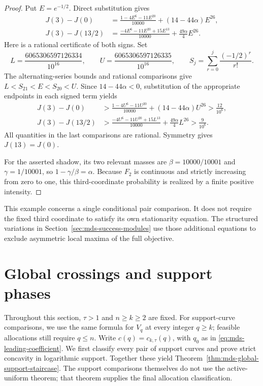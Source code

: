 \documentclass[11pt]{article}
\theoremstyle{definition}
\theoremstyle{remark}
\newcommand{\1}{\mathbf 1}
\begin{document}
\begin{proof}
Put \(E=e^{-1/2}\).  Direct substitution gives
\begin{align*}
  J(3)-J(0)
  &=\frac{1-4E^6-11E^{20}}{10000}
    +(14-44\alpha)E^{26},\\
  J(3)-J(13/2)
  &=\frac{-4E^6-11E^{20}+15E^{13}}{10000}
    +\frac{49\alpha}{4}E^{26}.
\end{align*}
Here is a rational certificate of both signs.  Set
\[
  L=\frac{6065306597126334}{10^{16}},\qquad
  U=\frac{6065306597126335}{10^{16}},\qquad
  S_j=\sum_{r=0}^j\frac{(-1/2)^r}{r!}.
\]
The alternating-series bounds and rational comparisons give
\(L<S_{21}<E<S_{20}<U\).  Since \(14-44\alpha<0\), substitution
of the appropriate endpoints in each signed term yields
\begin{align*}
  J(3)-J(0)
  &>\frac{1-4U^6-11U^{20}}{10000}
      +(14-44\alpha)U^{26}
    >\frac{12}{10^6},\\
  J(3)-J(13/2)
  &>\frac{-4U^6-11U^{20}+15L^{13}}{10000}
      +\frac{49\alpha}{4}L^{26}
    >\frac9{10^6}.
\end{align*}
All quantities in the last comparisons are rational.  Symmetry gives
\(J(13)=J(0)\).

For the asserted shadow, its two relevant masses are
\(\beta=10000/10001\) and \(\gamma=1/10001\), so
\(1-\gamma/\beta=\alpha\).  Because \(F_2\) is continuous and
strictly increasing from zero to one, this third-coordinate
probability is realized by a finite positive intensity.
\end{proof}

This example concerns a single conditional pair comparison.  It does
not require the fixed third coordinate to satisfy its own
stationarity equation.  The structured variations in
Section~\ref{sec:mds-success-modules} use those additional equations
to exclude asymmetric local maxima of the full objective.

\section{Global crossings and support phases}
\label{sec:mds-global-support}

Throughout this section, \(\tau>1\) and \(n\ge k\ge2\) are fixed.
For support-curve comparisons, we use the same formula for \(V_q\)
at every integer \(q\ge k\); feasible allocations still require
\(q\le n\).
Write \(c(q)=c_{k,\tau}(q)\), with \(q_0\) as in
\eqref{eq:mds-leading-coefficient}. We first classify every pair of
support curves and prove strict concavity in logarithmic support.
Together these yield Theorem~\ref{thm:mds-global-support-staircase}.
The support comparisons themselves do not use the active-uniform
theorem; that theorem supplies the final allocation classification.
\end{document}
